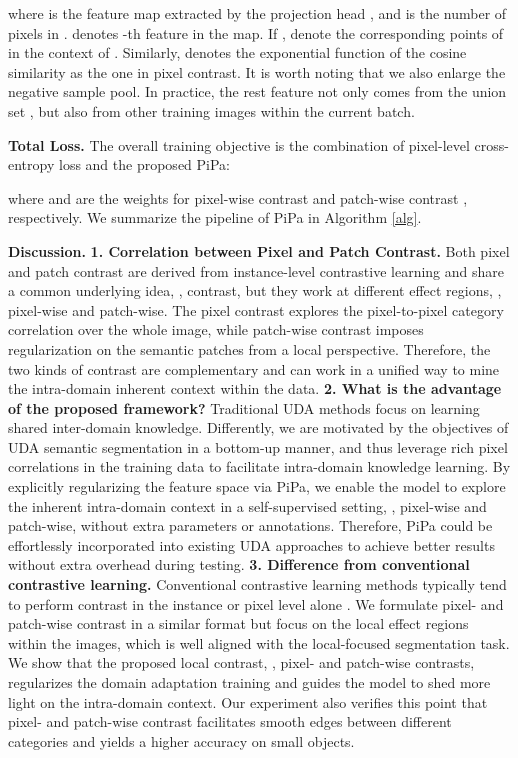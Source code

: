 \documentclass[10pt,twocolumn,letterpaper]{article}
\begin{document}
where  is the feature map extracted by the projection head , and  is the number of pixels in .  denotes -th feature in the map. If ,  denote the corresponding points of  in the context of .  
Similarly,  denotes the exponential function of the cosine similarity as the one in pixel contrast. It is worth noting that we also enlarge the negative sample pool. In practice, the rest feature  not only comes from the union set , but also from other training images within the current batch.

\noindent\textbf{Total Loss.} The overall training objective is the combination of pixel-level cross-entropy loss and the proposed PiPa: 

where  and  are the weights for pixel-wise contrast  and patch-wise contrast , respectively.  We summarize the pipeline of PiPa in Algorithm \ref{alg}.

\noindent\textbf{Discussion.} \textbf{1. Correlation between Pixel and Patch Contrast.} Both pixel and patch contrast are derived from instance-level contrastive learning and share a common underlying idea, \ie, contrast, but they work at different effect regions, \ie, pixel-wise and patch-wise. The pixel contrast explores the pixel-to-pixel category correlation over the whole image, while patch-wise contrast imposes regularization on the semantic patches from a local perspective. 
Therefore, the two kinds of contrast are complementary and can work in a unified way to mine the intra-domain inherent context within the data.
\textbf{2. What is the advantage of the proposed framework?} Traditional UDA methods focus on learning shared inter-domain knowledge. Differently, we are motivated by the objectives of UDA semantic segmentation in a bottom-up manner, and thus leverage rich pixel correlations in the training data to facilitate intra-domain knowledge learning. By explicitly regularizing the feature space via PiPa, we enable the model to explore the inherent intra-domain context in a self-supervised setting, \ie, pixel-wise and patch-wise,  without extra parameters or annotations. 
Therefore, PiPa could be effortlessly incorporated into existing UDA approaches to achieve better results without extra overhead during testing.
\textbf{3. Difference from conventional contrastive learning.}
Conventional contrastive learning methods typically tend to perform contrast in the instance or pixel level alone \cite{ZhirongWu2018UnsupervisedFL, huang2022category, WenguanWang2021ExploringCP}. 
We formulate pixel- and patch-wise contrast in a similar format but focus on the local effect regions within the images, which is well aligned with the local-focused segmentation task. 
We show that the proposed local contrast, \ie, pixel- and patch-wise contrasts, regularizes the domain adaptation training and guides the model to shed more light on the intra-domain context. 
Our experiment also verifies this point that pixel- and patch-wise contrast facilitates smooth edges between different categories and yields a higher accuracy on small objects.
\end{document}
